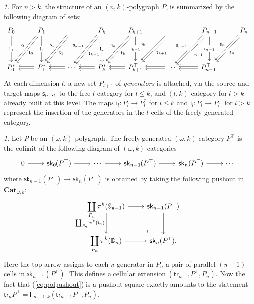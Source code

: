 \documentclass[reqno]{amsart}
\theoremstyle{plain}
\theoremstyle{definition}
\theoremstyle{remark}
\newtheorem{paragr}[subsubsection]{} %
\newcommand{\pair}[2]{(#1,#2)}       %
\newcommand{\source}{\mathsf{s}} %
\newcommand{\target}{\mathsf{t}} %
\newcommand{\geninc}{\mathsf{i}} %
\newcommand{\ctg}[1]{\mathbf{#1}}  %
\newcommand{\Cat}{\ctg{Cat}}   %
\newcommand{\opCat}[1]{\Cat_{\omega,#1}} %
\newcommand{\functor}[1]{\mathsf{#1}} %
\newcommand{\trk}[1]{\functor{tr}_{#1}}%
\newcommand{\pifun}[2]{\functor{\pi}_{#2}^{#1}}%
\newcommand{\skl}[1]{\functor{sk}_{#1}}%
\newcommand{\opifun}[1]{\pifun{#1}{}}%
\newcommand{\frf}[1]{\functor{F}_{#1}} %
\newcommand{\tdouble}[3]{
  \arrow[#1,shift left=0.4ex,#3]
  \arrow[#1,shift right=0.4ex,#2]
}
\newcommand{\sce}[1]{\source_{#1}} %
\newcommand{\tge}[1]{\target_{#1}} %
\newcommand{\frcat}[1]{#1^*} %
\newcommand{\frgp}[1]{#1^\top} %
\newcommand{\ook}[1]{\ensuremath{\pair{\omega}{#1}}}
\newcommand{\clx}[2]{\pair{#1}{#2}}%
\newcommand{\gni}[1]{\geninc_{#1}}%
\newcommand{\Sph}[1]{\mathbb{S}_{#1}} %
\newcommand{\Dsk}[1]{\mathbb{D}_{#1}} %
\newcommand{\gcof}[1]{\functor{i}_{#1}} %
\newcommand{\nbd}{\nobreakdash} %
\begin{document}
\begin{paragr}\label{paragr:okpol}
  For $n>k$, the structure of an $\pair nk$-polygraph $P$,  is
  summarized by the following diagram of sets:
  \[
  \begin{tikzcd}[row sep=huge]
    P_0\ar[d,"\gni 0" description]&P_1\ar[d,"\gni
    1" description]\tdouble{ld}{"\sce 0"'}{"\tge 0"}&\phantom{P_2}\tdouble{ld}{"\sce
      1"'}{"\tge 1"}&P_k\ar[d,"\gni{k}"
    description]\tdouble{ld}{"\sce{k-1}"'}{"\tge{k-1}"}&P_{k+1}\ar[d,"\gni{k+1}"
    description]\tdouble{ld}{"\sce k"'}{"\tge
      k"}&\phantom{P_{k+2}}\tdouble{ld}{"\sce{k+1}"'}{"\tge{k+1}"}&P_{n-1}\ar[d,"\gni{n-1}"
    description]\tdouble{ld}{"\sce{n-1}"'}{"\tge{n-1}"}&P_n\tdouble{ld}{"\sce n"'}{"\tge n"}\\
    \frcat P_0&\frcat P_1\tdouble{l}{""}{""}&\cdots\tdouble{l}{""}{""}&\frcat P_k\tdouble{l}{""}{""}&\frgp
    P_{k+1}\tdouble{l}{""}{""}&\cdots\tdouble{l}{""}{""}&\frgp P_{n-1}\tdouble{l}{""}{""}.&
  \end{tikzcd}
  \]
  At each dimension $l$, a new set $P_{l+1}$ of {\em generators} is
  attached, via the source and target maps $\sce l$, $\tge l$, to the free
  $l$-category for $l\leq k$, and  $\pair lk$-category for $l>k$ already built at this level.  The
  maps $\gni l:P_l\to \frcat{P}_l$ for $l\leq k$ and $\gni l:P_l\to
  \frgp{P}_l$ for $l>k$ represent the insertion of the generators in
  the $l$-cells of the freely generated category.
\end{paragr}
\begin{paragr}\label{paragr:opolpushout}
  Let $P$ be an $\ook k$-polygraph. The freely generated $\ook
  k$-category $\frgp P$ is the colimit of the following diagram of
  $\ook k$-categories
  \[
    \begin{tikzcd}
      0\ar[r]&\skl 0(\frgp P)\ar[r] & \cdots\ar[r] &\skl{n-1}(\frgp
      P)\ar[r] &\skl n(\frgp P)\ar[r]&\cdots
    \end{tikzcd}
    \]
  where $\skl{n-1}(\frgp P)\to\skl n(\frgp P)$ is
  obtained by taking the following pushout in $\opCat k$:
  \begin{equation}
    \label{eq:polpushout}
    \begin{tikzcd}
      \displaystyle\coprod_{P_{n}} \opifun k (\Sph{n-1})
     \ar[d,"\coprod_{P_{n}}\opifun k(\gcof {n})"',start anchor={[yshift=2.6ex]},end anchor={[yshift=-0.25ex]}]\ar[r]& \skl{n-1}(\frgp P\ar[d])\\
      \displaystyle\coprod_{P_{n}}\opifun k(\Dsk{n})\ar[r]& \skl
      n(\frgp P).
      \ar[from=1-1,to=2-2,phantom,"\ulcorner",very near end]
    \end{tikzcd}
  \end{equation}
  Here the top arrow assigns to each $n$\nbd-generator in $P_n$ a pair of parallel $(n{-}1)$-cells in
  $\skl{n-1}(\frgp P)$. This defines a cellular extension 
  $\clx{\trk{n-1}\frgp P}{P_n}$.  Now the fact that
  (\ref{eq:polpushout}) is a pushout square exactly amounts to the statement $\trk n\frgp
  P=\frf{n-1,k}\clx{\trk{n-1}\frgp P}{P_n}$.
\end{paragr}
\end{document}
